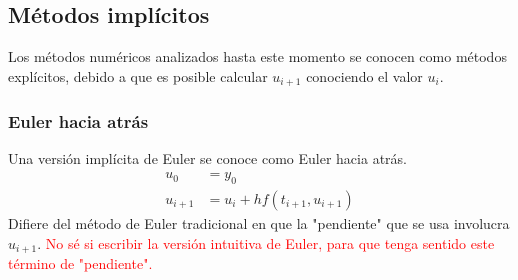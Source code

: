 \subsection{Métodos implícitos}
Los métodos numéricos analizados hasta este momento se conocen como métodos explícitos, debido a que es posible calcular $u_{i+1}$ conociendo el valor $u_i$. 
\subsubsection{Euler hacia atrás}
Una versión implícita de Euler se conoce como Euler hacia atrás. 
\begin{align}
    u_0  &= y_0 \\
    u_{i+1} &= u_i + hf(t_{i+1}, u_{i+1})
\end{align}
Difiere del método de Euler tradicional en que la "pendiente" que se usa involucra $u_{i+1}$.
\textcolor{red}{No sé si escribir la versión intuitiva de Euler, para que tenga sentido este término de "pendiente".}

